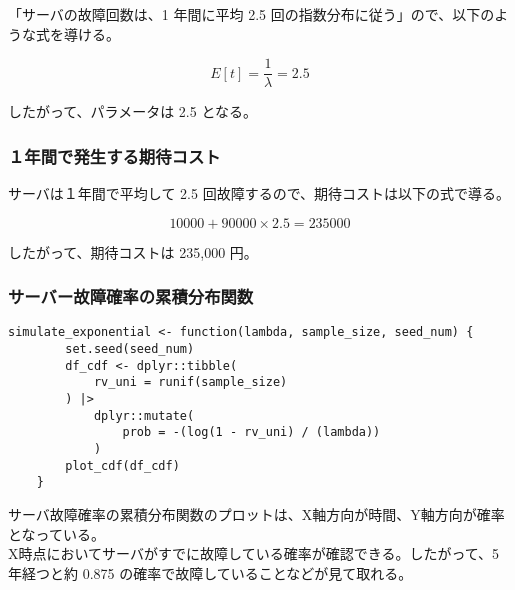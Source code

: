 \documentclass{article}
\begin{document}
「サーバの故障回数は、1 年間に平均 2.5 回の指数分布に従う」ので、以下のような式を導ける。

\[ E[t] = \frac{1}{\lambda} = 2.5 \]

したがって、パラメータ\lambda は 2.5 となる。

\subsubsection{１年間で発生する期待コスト}

サーバは１年間で平均して 2.5 回故障するので、期待コストは以下の式で導る。

\[ 10000 + 90000 \times 2.5 = 235000 \]

したがって、期待コストは 235,000 円。

\subsubsection{サーバー故障確率の累積分布関数}

\begin{lstlisting}[]
	simulate_exponential <- function(lambda, sample_size, seed_num) {
		set.seed(seed_num)
		df_cdf <- dplyr::tibble(
			rv_uni = runif(sample_size)
		) |>
			dplyr::mutate(
				prob = -(log(1 - rv_uni) / (lambda))
			)
		plot_cdf(df_cdf)
	}

\end{lstlisting}

サーバ故障確率の累積分布関数のプロットは、X軸方向が時間、Y軸方向が確率となっている。\\
X時点においてサーバがすでに故障している確率が確認できる。したがって、5年経つと約 0.875 の確率で故障していることなどが見て取れる。
\end{document}
